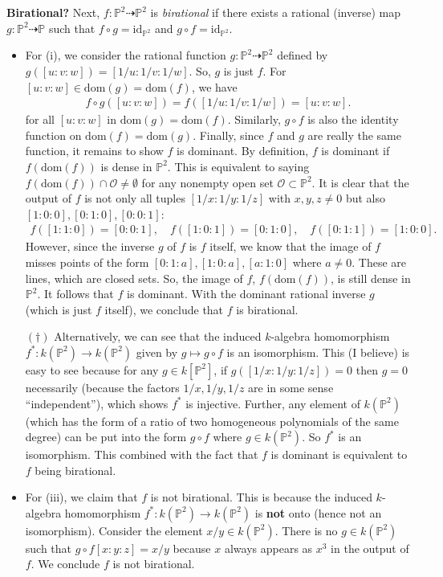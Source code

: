 \documentclass[12pt]{article}
\begin{document}
\noindent \textbf{Birational?} Next, $f: \mathbb{P}^2 \dashrightarrow \mathbb{P}^2$ is \textit{birational} if there exists a rational (inverse) map $g: \mathbb{P}^2 \dashrightarrow \mathbb{P}$ such that $f\circ g = \mbox{id}_{\mathbb{P}^2}$ and $g\circ f = \mbox{id}_{\mathbb{P}^2}$. 
\begin{itemize}
\item For (i), we consider the rational function $g : \mathbb{P}^2 \dashrightarrow \mathbb{P}^2$ defined by $g([u:v:w]) = [1/u:1/v:1/w]$. So, $g$ is just $f$. For $[u:v:w] \in \mbox{dom}(g) = \mbox{dom}(f)$, we have
\begin{align*}
f\circ g([u:v:w]) = f([1/u:1/v:1/w]) = [u:v:w].
\end{align*}
for all $[u:v:w]$ in $\mbox{dom}(g) = \mbox{dom}(f)$. Similarly, $g\circ f$ is also the identity function on $\mbox{dom}(f) = \mbox{dom}(g)$. Finally, since $f$ and $g$ are really the same function, it remains to show $f$ is dominant. By definition, $f$ is dominant if $f(\mbox{dom}(f))$ is dense in $\mathbb{P}^2$. This is equivalent to saying $f(\mbox{dom}(f)) \cap \mathcal{O} \neq \emptyset$ for any nonempty open set $\mathcal{O} \subset \mathbb{P}^2$. It is clear that the output of $f$ is not only all tuples $[1/x:1/y:1/z]$ with $x,y,z\neq 0$ but also $[1:0:0], [0:1:0], [0:0:1]$: 
\begin{align*}
f([1:1:0]) = [0:0:1], \quad f([1:0:1]) = [0:1:0], \quad 
f([0:1:1]) = [1:0:0].
\end{align*}  
However, since the inverse $g$ of $f$ is $f$ itself, we know that the image of $f$ misses points of the form $[0:1:a],[1:0:a],[a:1:0]$ where $a\neq 0$. These are lines, which are closed sets. So, the image of $f$, $f(\mbox{dom}(f))$, is still dense in $\mathbb{P}^2$. It follows that $f$ is dominant. With the dominant rational inverse $g$ (which is just $f$ itself), we conclude that $f$ is birational. 


$(\dagger)$ Alternatively, we can see that the induced $k$-algebra homomorphism $f^*: k(\mathbb{P}^2) \to k(\mathbb{P}^2)$ given by $g \mapsto g\circ f$ is an isomorphism. This (I believe) is easy to see because for any $g\in k[\mathbb{P}^2]$, if $g([1/x:1/y:1/z]) = 0$ then $g =0$ necessarily (because the factors $1/x, 1/y,1/z$ are in some sense ``independent''), which shows $f^*$ is injective. Further, any element of $k(\mathbb{P}^2)$ (which has the form of a ratio of two homogeneous polynomials of the same degree) can be put into the form $g\circ f$ where $g\in k(\mathbb{P}^2)$. So $f^*$ is an isomorphism. This combined with the fact that $f$ is dominant is equivalent to $f$ being birational.  


\item For (iii), we claim that $f$ is not birational. This is because the induced $k$-algebra homomorphism $f^* : k(\mathbb{P}^2) \to k(\mathbb{P}^2)$ is \textbf{not} onto (hence not an isomorphism).  Consider the element $x/y \in k(\mathbb{P}^2)$. There is no $g\in k(\mathbb{P}^2)$ such that $g\circ f[x:y:z] = x/y$ because $x$ always appears as $x^3$ in the output of $f$. We conclude $f$ is not birational.
\end{itemize}
\end{document}

